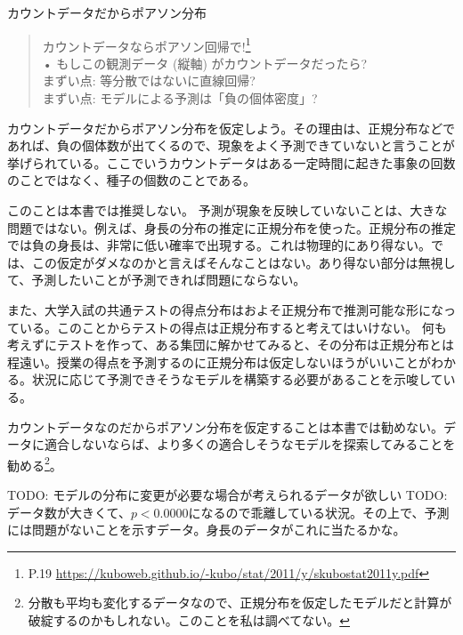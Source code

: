\begin{SMbox}{カウントデータだからポアソン分布}
    \begin{quote}
        カウントデータならポアソン回帰で!\footnote{P.19 \url{https://kuboweb.github.io/-kubo/stat/2011/y/skubostat2011y.pdf}}\\
        • もしこの観測データ (縦軸) がカウントデータだったら?\\
        まずい点: 等分散ではないに直線回帰?\\
        まずい点: モデルによる予測は「負の個体密度」?\\
    \end{quote}
    カウントデータだからポアソン分布を仮定しよう。その理由は、正規分布などであれば、負の個体数が出てくるので、現象をよく予測できていないと言うことが挙げられている。ここでいうカウントデータはある一定時間に起きた事象の回数のことではなく、種子の個数のことである。

    このことは本書では推奨しない。
    予測が現象を反映していないことは、大きな問題ではない。例えば、身長の分布の推定に正規分布を使った。正規分布の推定では負の身長は、非常に低い確率で出現する。これは物理的にあり得ない。では、この仮定がダメなのかと言えばそんなことはない。あり得ない部分は無視して、予測したいことが予測できれば問題にならない。

    また、大学入試の共通テストの得点分布はおよそ正規分布で推測可能な形になっている。このことからテストの得点は正規分布すると考えてはいけない。
    何も考えずにテストを作って、ある集団に解かせてみると、その分布は正規分布とは程遠い。授業の得点を予測するのに正規分布は仮定しないほうがいいことがわかる。状況に応じて予測できそうなモデルを構築する必要があることを示唆している。

    カウントデータなのだからポアソン分布を仮定することは本書では勧めない。データに適合しないならば、より多くの適合しそうなモデルを探索してみることを勧める\footnote{分散も平均も変化するデータなので、正規分布を仮定したモデルだと計算が破綻するのかもしれない。このことを私は調べてない。}。
    
\end{SMbox}




TODO: モデルの分布に変更が必要な場合が考えられるデータが欲しい
TODO: データ数が大きくて、$p<0.0000$になるので乖離している状況。その上で、予測には問題がないことを示すデータ。身長のデータがこれに当たるかな。
\fi

